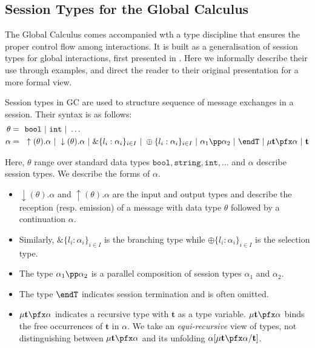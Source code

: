 
\subsection{Session Types for the Global Calculus}
\label{Logic4Struct-GlobalTypes}

The Global Calculus comes accompanied wth a type discipline that
ensures the proper control flow among interactions. It is built as a
generalisation of session types \cite{honda1998lpa} for global
interactions, first presented in \cite{carbone7scc}.  Here we
informally describe
their use through examples, and direct the reader  to their original presentation for
a more formal view. 

Session types in
GC are used to structure sequence of message exchanges in a session.
Their syntax is as follows:
\begin{align}\label{Logic4Struct:eq:sessiontypes}
  \theta =& ~~\mathtt{bool} ~|~ \mathtt{ int}  ~|~ \ldots  \notag\\
  \alpha = & ~~
  \uparrow(\theta).\alpha
  ~|~
  \downarrow(\theta).\alpha
  ~|~
  \&\{ l_i: \alpha_i\}_{i\in{I}}
  ~|~ \oplus\{ l_i: \alpha_i\}_{i\in{I}}  ~|~ \alpha_1 \pp \alpha_2 ~|~ \endT ~|~ \mu \mathbf{
    t }\pfx \alpha ~|~  \mathbf{ t }
\end{align}

Here, $\theta$ range over standard data types $\mathtt{bool, string, int,
  \dots}$ and $\alpha$ describe session types.  We describe the forms
of $\alpha$. 
\begin{itemize}
\item $\downarrow(\theta).\alpha$ and $\uparrow(\theta).\alpha$ are
  the input and output types and describe the reception (resp.
  emission) of a message with data type $\theta$ followed by a
  continuation $\alpha$.
\item Similarly, $\&\{ l_i: \alpha_i\}_{i\in{I}}$ is the branching
  type while $\oplus\{ l_i: \alpha_i\}_{i\in{I}}$ is the selection
  type.
 \item The type $\alpha_1 \pp \alpha_2$ is a parallel composition of
   session types $\alpha_1$ and $\alpha_2$. 
\item The type $\endT$ indicates session termination and is often
  omitted.
\item $\mu \mathbf{t} \pfx \alpha$ indicates a recursive type with
  $\mathbf{t}$ as a type variable. $\mu \mathbf{t} \pfx \alpha$ binds
  the free occurrences of $\mathbf{t}$ in $\alpha$. We take an
  \emph{equi-recursive} view of types, not distinguishing between $\mu
  \mathbf{t} \pfx \alpha$ and its unfolding $\alpha [\mu \mathbf{t}
  \pfx \alpha / \mathbf{t}]$.
\end{itemize}

